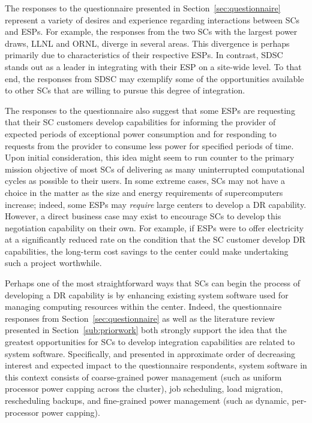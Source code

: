 The responses to the questionnaire presented in
Section~\ref{sec:questionnaire} represent a variety of desires and
experience regarding interactions between SCs and
ESPs. For example, the responses from the two SCs
with the largest power draws, LLNL and ORNL, diverge in several
areas. This divergence is perhaps primarily due to characteristics of
their respective ESPs. In contrast, SDSC stands out as a leader in integrating
with their ESP on a site-wide level. To that end, the
responses from SDSC may exemplify some of the opportunities available
to other SCs that are willing to pursue this degree
of integration.

The responses to the questionnaire also suggest that some ESPs are requesting that their SC customers
develop capabilities for informing the provider of expected periods of
exceptional power consumption and for responding to requests from the
provider to consume less power for specified periods of time. Upon
initial consideration, this idea might seem to run counter to the
primary mission objective of most SCs of delivering
as many uninterrupted computational cycles as possible to their users.
In some extreme cases, SCs may not have a choice
in the matter as the size and energy requirements of supercomputers
increase; indeed, some ESPs may \textit{require} large
centers to develop a DR capability. However, a direct
business case may exist to encourage SCs to develop
this negotiation capability on their own. For example, if ESPs were to offer electricity at a significantly reduced rate
on the condition that the SC customer develop
DR capabilities, the long-term cost savings to the
center could make undertaking such a project worthwhile.

Perhaps one of the most straightforward ways that SCs can begin the process of developing a DR
capability is by enhancing existing system software used for managing
computing resources within the center. Indeed, the questionnaire
responses from Section~\ref{sec:questionnaire} as well as the literature
review presented in Section~\ref{sub:priorwork} both strongly support the
idea that the greatest opportunities for SCs to
develop integration capabilities are related to system software.
Specifically, and presented in approximate order of decreasing
interest and expected impact to the questionnaire respondents, system
software in this context consists of coarse-grained power management
(such as uniform processor power capping across the cluster), job scheduling, load migration, rescheduling backups, and fine-grained 
power management (such as dynamic, per-processor power capping).

